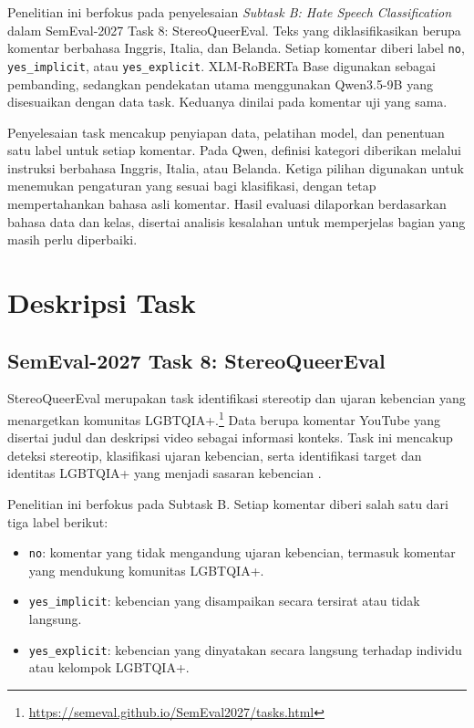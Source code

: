 \documentclass[11pt]{article}
\begin{document}
Penelitian ini berfokus pada penyelesaian \textit{Subtask B: Hate Speech Classification} dalam SemEval-2027 Task 8: StereoQueerEval. Teks yang diklasifikasikan berupa komentar berbahasa Inggris, Italia, dan Belanda. Setiap komentar diberi label \texttt{no}, \texttt{yes\_implicit}, atau \texttt{yes\_explicit}. XLM-RoBERTa Base digunakan sebagai pembanding, sedangkan pendekatan utama menggunakan Qwen3.5-9B yang disesuaikan dengan data task. Keduanya dinilai pada komentar uji yang sama.

Penyelesaian task mencakup penyiapan data, pelatihan model, dan penentuan satu label untuk setiap komentar. Pada Qwen, definisi kategori diberikan melalui instruksi berbahasa Inggris, Italia, atau Belanda. Ketiga pilihan digunakan untuk menemukan pengaturan yang sesuai bagi klasifikasi, dengan tetap mempertahankan bahasa asli komentar. Hasil evaluasi dilaporkan berdasarkan bahasa data dan kelas, disertai analisis kesalahan untuk memperjelas bagian yang masih perlu diperbaiki.

\section{Deskripsi Task}
\subsection{SemEval-2027 Task 8: StereoQueerEval}
\label{sec:task}
StereoQueerEval merupakan task identifikasi stereotip dan ujaran kebencian yang menargetkan komunitas LGBTQIA+.\footnote{\url{https://semeval.github.io/SemEval2027/tasks.html}} Data berupa komentar YouTube yang disertai judul dan deskripsi video sebagai informasi konteks. Task ini mencakup deteksi stereotip, klasifikasi ujaran kebencian, serta identifikasi target dan identitas LGBTQIA+ yang menjadi sasaran kebencian \citep{stereoqueereval-2026-data}.

Penelitian ini berfokus pada Subtask B. Setiap komentar diberi salah satu dari tiga label berikut:
\begin{itemize}
    \item \texttt{no}: komentar yang tidak mengandung ujaran kebencian, termasuk komentar yang mendukung komunitas LGBTQIA+.
    \item \texttt{yes\_implicit}: kebencian yang disampaikan secara tersirat atau tidak langsung.
    \item \texttt{yes\_explicit}: kebencian yang dinyatakan secara langsung terhadap individu atau kelompok LGBTQIA+.
\end{itemize}
\end{document}
